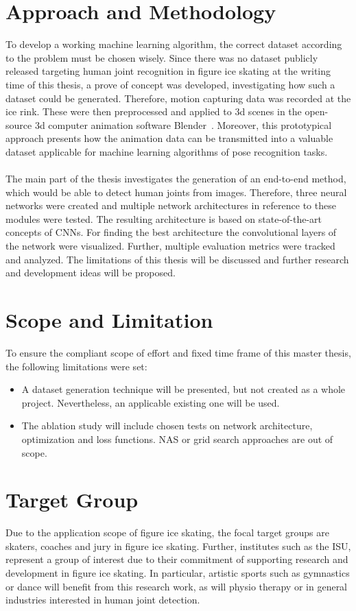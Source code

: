 \section{Approach and Methodology}
To develop a working machine learning algorithm, the correct dataset according to the problem must be chosen wisely.
Since there was no dataset publicly released targeting human joint recognition in figure ice skating at the writing time
of this thesis, a prove of concept was developed, investigating how such a dataset could be generated.
Therefore, motion capturing data was recorded at the ice rink.
These were then preprocessed and applied to 3d scenes in the open-source 3d computer animation software Blender~\cite{blender}.
Moreover, this prototypical approach presents how the animation data can be transmitted into a valuable dataset applicable for machine learning
algorithms of pose recognition tasks.
\\\mbox{}\\
The main part of the thesis investigates the generation of an end-to-end method, which would be able to detect human joints
from images.
Therefore, three neural networks were created and multiple network architectures in reference to these modules were tested.
The resulting architecture is based on state-of-the-art concepts of \glspl{CNN}.
For finding the best architecture the convolutional layers of the network were visualized.
Further, multiple evaluation metrics were tracked and analyzed.
The limitations of this thesis will be discussed and further research and development ideas will be proposed.



\section{Scope and Limitation}
To ensure the compliant scope of effort and fixed time frame of this master thesis, the following limitations were set:

\begin{itemize}
    \item A dataset generation technique will be presented, but not created as a whole project.
    Nevertheless, an applicable existing one will be used.
    \item The ablation study will include chosen tests on network architecture, optimization and loss functions.
    \gls{NAS} or grid search approaches are out of scope.
\end{itemize}
\section{Target Group}
Due to the application scope of figure ice skating, the focal target groups are skaters, coaches and jury in figure ice skating.
Further, institutes such as the \gls{ISU}, represent a group of interest due to their commitment of supporting research and development
in figure ice skating.
In particular, artistic sports such as gymnastics or dance will benefit from this research work, as will physio therapy or
in general industries interested in human joint detection.

